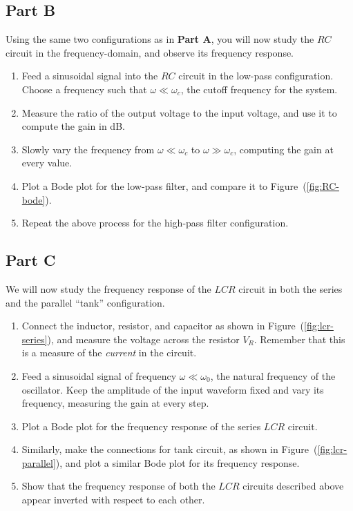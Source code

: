 \subsection*{Part B}

Using the same two configurations as in \textbf{Part A}, you will now study the $RC$ circuit in the frequency-domain, and observe its frequency response.

\begin{enumerate}
    \item Feed a sinusoidal signal into the $RC$ circuit in the low-pass configuration. Choose a frequency such that $\omega \ll \omega_c$, the cutoff frequency for the system.
    \item Measure the ratio of the output voltage to the input voltage, and use it to compute the gain in dB.
    \item Slowly vary the frequency from $\omega \ll \omega_c$ to $\omega \gg \omega_c$, computing the gain at every value.
    \item Plot a Bode plot for the low-pass filter, and compare it to Figure~(\ref{fig:RC-bode}).
    \item Repeat the above process for the high-pass filter configuration.
\end{enumerate}

\subsection*{Part C}

We will now study the frequency response of the $LCR$ circuit in both the series and the parallel ``tank'' configuration.

\begin{enumerate}
    \item Connect the inductor, resistor, and capacitor as shown in Figure~(\ref{fig:lcr-series}), and measure the voltage across the resistor $V_R$. Remember that this is a measure of the \textsl{current} in the circuit.
    \item Feed a sinusoidal signal of frequency $\omega \ll \omega_0$, the natural frequency of the oscillator. Keep the amplitude of the input waveform fixed and vary its frequency, measuring the gain at every step.
    \item Plot a Bode plot for the frequency response of the series $LCR$ circuit.
    
    \item Similarly, make the connections for tank circuit, as shown in Figure~(\ref{fig:lcr-parallel}), and plot a similar Bode plot for its frequency response.
    \item Show that the frequency response of both the $LCR$ circuits described above appear inverted with respect to each other.
\end{enumerate}